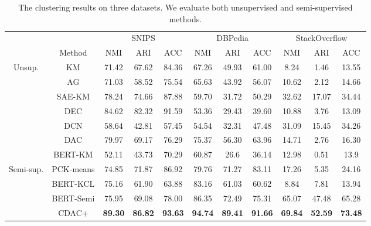\documentclass[letterpaper]{article} \usepackage{aaai20}  \usepackage{times}  \usepackage{helvet} \usepackage{courier}  \usepackage[hyphens]{url}  \usepackage{graphicx} \urlstyle{rm} \def\UrlFont{\rm}  \usepackage{graphicx}  \frenchspacing  \setlength{\pdfpagewidth}{8.5in}  \setlength{\pdfpageheight}{11in}
\begin{document}
\begin{table*}[t!]
\centering
\begin{tabular}{@{\extracolsep{4pt}}ccccccccccc}
\toprule
\centering
 &  & \multicolumn{3}{c}{SNIPS} & \multicolumn{3}{c}{DBPedia} & \multicolumn{3}{c}{StackOverflow} \\
 \addlinespace[0.1cm] \cline{3-5} \cline{6-8} \cline{9-11}  \addlinespace[0.1cm]
 & Method & NMI & ARI & ACC & NMI & ARI & ACC & NMI & ARI & ACC \\
\midrule
\multirow{6}{*}{Unsup.} 
& KM & 71.42 & 67.62 & 84.36 & 67.26 & 49.93 & 61.00 & 8.24 & 1.46 & 13.55 \\
& AG & 71.03 & 58.52 & 75.54 & 65.63 & 43.92 & 56.07 & 10.62 & 2.12 & 14.66 \\
& SAE-KM & 78.24 & 74.66 & 87.88 & 59.70 & 31.72 & 50.29 & 32.62 & 17.07 & 34.44 \\
& DEC & 84.62 & 82.32 & 91.59 & 53.36 & 29.43 & 39.60 & 10.88 & 3.76 & 13.09 \\
& DCN & 58.64 & 42.81 & 57.45 & 54.54 & 32.31 & 47.48 & 31.09 & 15.45 & 34.26 \\
& DAC & 79.97 & 69.17 & 76.29 & 75.37 & 56.30 & 63.96 & 14.71 & 2.76 & 16.30 \\
& BERT-KM & 52.11 & 43.73 & 70.29 & 60.87 & 26.6 & 36.14 & 12.98 & 0.51 & 13.9 \\
\midrule
\multirow{4}{*}{Semi-sup.} 
& PCK-means & 74.85 & 71.87 & 86.92 & 79.76 & 71.27 & 83.11 & 17.26 & 5.35 & 24.16 \\
& BERT-KCL & 75.16 & 61.90 & 63.88 & 83.16 & 61.03 & 60.62 & 8.84 & 7.81 & 13.94 \\
& BERT-Semi & 75.95 & 69.08 & 78.00 & 86.35 & 72.49 & 75.31 & 65.07 & 47.48 & 65.28 \\
& CDAC+ & \textbf{89.30} & \textbf{86.82} & \textbf{93.63} & \textbf{94.74} & \textbf{89.41} & \textbf{91.66} & \textbf{69.84} & \textbf{52.59} & \textbf{73.48} \\
\bottomrule
\end{tabular}
\caption{ \label{results-main}  
The clustering results on three datasets. We evaluate both unsupervised and semi-supervised methods.  
}
\end{table*}
\end{document}
